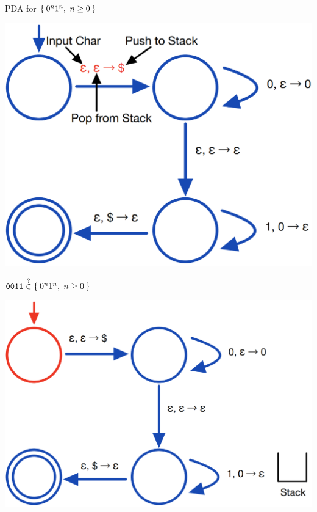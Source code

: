 \documentclass[aspectratio=169]{beamer}
\begin{document}
\begin{frame}{PDA for $\Set{0^n 1^n,\ n \geq 0}$}
    \begin{center}
        \includegraphics[scale=0.30]{images/PDA_2.png}
    \end{center}
\end{frame}

\begin{frame}{$\texttt{0011} \stackrel{?}{\in} \Set{0^n 1^n,\ n \geq 0}$}
    \begin{center}
        \includegraphics[scale=0.30]{images/pda_comp/PDA_Comp_1.png}
    \end{center}
\end{frame}
\end{document}
